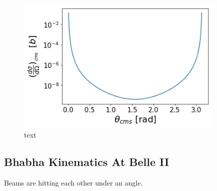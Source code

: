 \documentclass[a4paper,11pt,twosided,final,german,openbib,pdftex,listof=totoc,bibliography=totoc]{scrbook}
\begin{document}
\begin{figure}[h!]
	\centering
	\includegraphics[width=10cm]{Bilder/dsdOb}
	\caption[Differential Cross Section For Bhabha Events]{text}
\end{figure}




\subsection{Bhabha Kinematics At Belle II}
\label{sec:Kinematics}

Beams are hitting each other under an angle.
\end{document}

